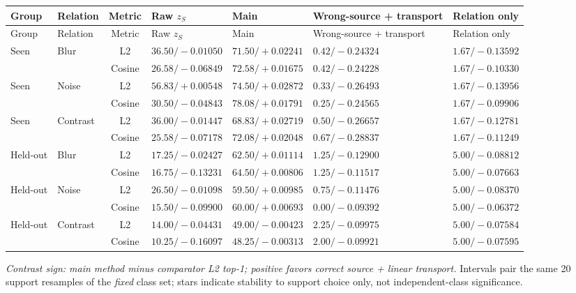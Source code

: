 \documentclass[10pt]{article}
\begin{document}
\scriptsize
\begin{longtable}{llcllll}
\toprule
Group & Relation & Metric & Raw $z_S$ & Main & Wrong-source + transport & Relation only\\
\midrule
\endfirsthead
\toprule
Group & Relation & Metric & Raw $z_S$ & Main & Wrong-source + transport & Relation only\\
\midrule
\endhead
Seen & Blur & L2 & $36.50/-0.01050$ & $71.50/+0.02241$ & $0.42/-0.24324$ & $1.67/-0.13592$\\
 & & Cosine & $26.58/-0.06849$ & $72.58/+0.01675$ & $0.42/-0.24228$ & $1.67/-0.10330$\\
Seen & Noise & L2 & $56.83/+0.00548$ & $74.50/+0.02872$ & $0.33/-0.26493$ & $1.67/-0.13956$\\
 & & Cosine & $30.50/-0.04843$ & $78.08/+0.01791$ & $0.25/-0.24565$ & $1.67/-0.09906$\\
Seen & Contrast & L2 & $36.00/-0.01447$ & $68.83/+0.02719$ & $0.50/-0.26657$ & $1.67/-0.12781$\\
 & & Cosine & $25.58/-0.07178$ & $72.08/+0.02048$ & $0.67/-0.28837$ & $1.67/-0.11249$\\
\midrule
Held-out & Blur & L2 & $17.25/-0.02427$ & $62.50/+0.01114$ & $1.25/-0.12900$ & $5.00/-0.08812$\\
 & & Cosine & $16.75/-0.13231$ & $64.50/+0.00806$ & $1.25/-0.11517$ & $5.00/-0.07663$\\
Held-out & Noise & L2 & $26.50/-0.01098$ & $59.50/+0.00985$ & $0.75/-0.11476$ & $5.00/-0.08370$\\
 & & Cosine & $15.50/-0.09900$ & $60.00/+0.00693$ & $0.00/-0.09392$ & $5.00/-0.06372$\\
Held-out & Contrast & L2 & $14.00/-0.04431$ & $49.00/-0.00423$ & $2.25/-0.09975$ & $5.00/-0.07584$\\
 & & Cosine & $10.25/-0.16097$ & $48.25/-0.00313$ & $2.00/-0.09921$ & $5.00/-0.07595$\\
\bottomrule
\end{longtable}
\normalsize

\emph{Contrast sign: main method minus comparator L2 top-1; positive favors correct source + linear transport.} Intervals pair the same 20 support resamples of the \emph{fixed} class set; stars indicate stability to support choice only, not independent-class significance.
\end{document}
